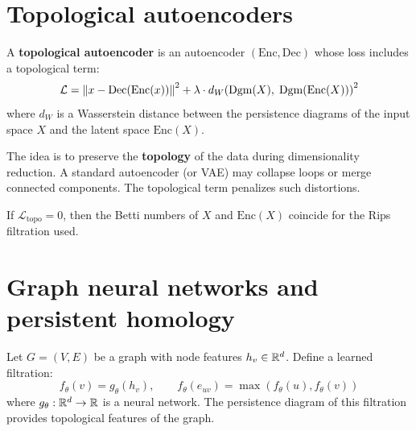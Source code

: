 \section{Topological autoencoders}
\label{sec:topo_autoencoders}

\begin{definition}
A \textbf{topological autoencoder} is an autoencoder
$(\mathrm{Enc}, \mathrm{Dec})$ whose loss includes a topological
term:
\[
  \mathcal{L} = \left\| x - \mathrm{Dec}(\mathrm{Enc}(x)) \right\|^2
  + \lambda \cdot d_W\!\left(\mathrm{Dgm}(X),\;
  \mathrm{Dgm}(\mathrm{Enc}(X))\right)^2
\]
where $d_W$ is a Wasserstein distance between the persistence
diagrams of the input space $X$ and the latent space
$\mathrm{Enc}(X)$.
\end{definition}

\begin{intuition}
The idea is to preserve the \textbf{topology} of the data during
dimensionality reduction. A standard autoencoder (or VAE) may
collapse loops or merge connected components. The topological term
penalizes such distortions.
\end{intuition}

\begin{proposition}
If $\mathcal{L}_{\mathrm{topo}} = 0$, then the Betti numbers of
$X$ and $\mathrm{Enc}(X)$ coincide for the Rips filtration used.
\end{proposition}

\section{Graph neural networks and persistent homology}
\label{sec:gnn_persistence}

\begin{definition}
Let $G = (V, E)$ be a graph with node features $h_v \in \mathbb{R}^d$.
Define a learned filtration:
\[
  f_\theta(v) = g_\theta(h_v), \qquad
  f_\theta(e_{uv}) = \max(f_\theta(u), f_\theta(v))
\]
where $g_\theta : \mathbb{R}^d \to \mathbb{R}$ is a neural network. The persistence
diagram of this filtration provides topological features of the graph.
\end{definition}

